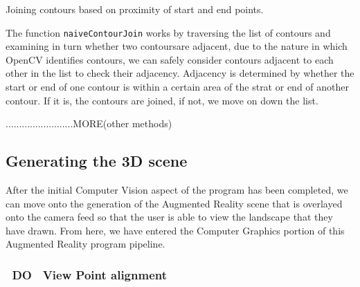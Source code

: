 \documentclass[11pt]{article}
\begin{document}
\begin{algorithm}
\DontPrintSemicolon
{}
\caption{Joining contours based on proximity of start and end points.}
\label{algo:naivecontourjoin}
\end{algorithm}

The function \texttt{naiveContourJoin} works by traversing the list of 
contours and examining in turn whether two contoursare adjacent, due to 
the nature in which OpenCV identifies contours, we can safely consider 
contours adjacent to each other in the list to check their adjacency. 
Adjacency is determined by whether the start or end of one contour is within
a certain area of the strat or end of another contour. If it is, the 
contours are joined, if not, we move on down the list.

.........................MORE(other methods)

\subsection{Generating the 3D scene}
After the initial Computer Vision aspect of the program has been completed,
we can move onto the generation of the Augmented Reality scene that is
overlayed onto the camera feed so that the user is able to view the
landscape that they have drawn. From here, we have entered the Computer
Graphics portion of this Augmented Reality program pipeline.
\subsubsection{~DO~ View Point alignment}
\end{document}

